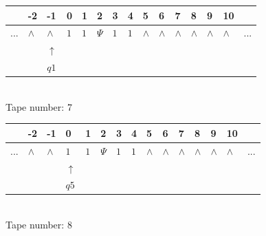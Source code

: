 \documentclass[11pt]{article}
\begin{document}
\begin{table}[H]
\centering
\begin{tabular}{lllllllllllllll}
 & -2 & -1 & 0 & 1 & 2 & 3 & 4 & 5 & 6 & 7 & 8 & 9 & 10 & \\
\hline
$...$ & \multicolumn{1}{|l|}{$\wedge$} & \multicolumn{1}{|l|}{$\wedge$} & \multicolumn{1}{|l|}{$1$} & \multicolumn{1}{|l|}{$1$} & \multicolumn{1}{|l|}{$\Psi$} & \multicolumn{1}{|l|}{$1$} & \multicolumn{1}{|l|}{$1$} & \multicolumn{1}{|l|}{$\wedge$} & \multicolumn{1}{|l|}{$\wedge$} & \multicolumn{1}{|l|}{$\wedge$} & \multicolumn{1}{|l|}{$\wedge$} & \multicolumn{1}{|l|}{$\wedge$} & \multicolumn{1}{|l|}{$\wedge$} & $...$\\
\hline
&  & $\uparrow$ &  &  &  &  &  &  &  &  &  &  &  &  \\
&  & $ q1 $ &  &  &  &  &  &  &  &  &  &  &  &  \\
\end{tabular}
\\
Tape number: 7
\noindent\makebox[\linewidth]{\hdashrule{\textwidth}{1pt}{1pt}}\end{table}

\begin{table}[H]
\centering
\begin{tabular}{lllllllllllllll}
 & -2 & -1 & 0 & 1 & 2 & 3 & 4 & 5 & 6 & 7 & 8 & 9 & 10 & \\
\hline
$...$ & \multicolumn{1}{|l|}{$\wedge$} & \multicolumn{1}{|l|}{$\wedge$} & \multicolumn{1}{|l|}{$1$} & \multicolumn{1}{|l|}{$1$} & \multicolumn{1}{|l|}{$\Psi$} & \multicolumn{1}{|l|}{$1$} & \multicolumn{1}{|l|}{$1$} & \multicolumn{1}{|l|}{$\wedge$} & \multicolumn{1}{|l|}{$\wedge$} & \multicolumn{1}{|l|}{$\wedge$} & \multicolumn{1}{|l|}{$\wedge$} & \multicolumn{1}{|l|}{$\wedge$} & \multicolumn{1}{|l|}{$\wedge$} & $...$\\
\hline
&  &  & $\uparrow$ &  &  &  &  &  &  &  &  &  &  &  \\
&  &  & $ q5 $ &  &  &  &  &  &  &  &  &  &  &  \\
\end{tabular}
\\
Tape number: 8
\noindent\makebox[\linewidth]{\hdashrule{\textwidth}{1pt}{1pt}}\end{table}
\end{document}
